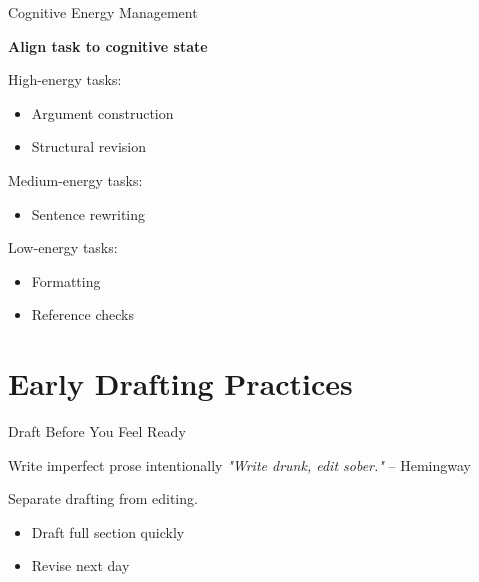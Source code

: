 \documentclass{beamer}
\begin{document}



\begin{frame}{Cognitive Energy Management}


\textbf{Align task to cognitive state}

\vspace{0.5em}


High-energy tasks:
\begin{itemize}
    \item Argument construction
    \item Structural revision
\end{itemize}

Medium-energy tasks:
\begin{itemize}
    \item Sentence rewriting
\end{itemize}

Low-energy tasks:
\begin{itemize}
    \item Formatting
    \item Reference checks
\end{itemize}


\end{frame}

\section{Early Drafting Practices}

\begin{frame}{Draft Before You Feel Ready}

\begin{block}{Write imperfect prose intentionally}
    \textit{"Write drunk, edit sober."} -- Hemingway
\end{block}

Separate drafting from editing.

\begin{itemize}
    \item Draft full section quickly
    \item Revise next day
\end{itemize}

\end{frame}
\end{document}

